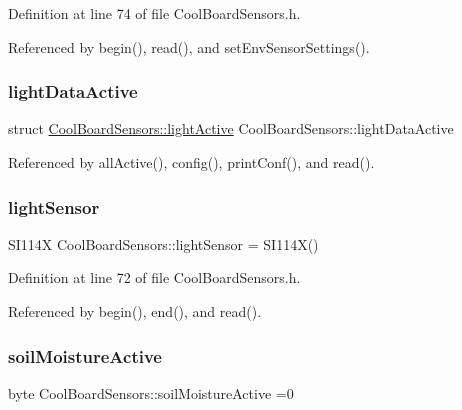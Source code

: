 Definition at line 74 of file Cool\+Board\+Sensors.\+h.



Referenced by begin(), read(), and set\+Env\+Sensor\+Settings().

\mbox{\label{classCoolBoardSensors_ac4deb1cf41bac8b91c780c92fab00ba4}} 
\subsubsection{\texorpdfstring{light\+Data\+Active}{lightDataActive}}
{\footnotesize\ttfamily struct \hyperlink{structCoolBoardSensors_1_1lightActive}{Cool\+Board\+Sensors\+::light\+Active} Cool\+Board\+Sensors\+::light\+Data\+Active\hspace{0.3cm}{\ttfamily [private]}}



Referenced by all\+Active(), config(), print\+Conf(), and read().

\mbox{\label{classCoolBoardSensors_a3e397300fb707dd193e909a757bf6102}} 
\subsubsection{\texorpdfstring{light\+Sensor}{lightSensor}}
{\footnotesize\ttfamily S\+I114X Cool\+Board\+Sensors\+::light\+Sensor = S\+I114X()}



Definition at line 72 of file Cool\+Board\+Sensors.\+h.



Referenced by begin(), end(), and read().

\mbox{\label{classCoolBoardSensors_a31983eecc0f9cd000e1f912206ea4dc8}} 
\subsubsection{\texorpdfstring{soil\+Moisture\+Active}{soilMoistureActive}}
{\footnotesize\ttfamily byte Cool\+Board\+Sensors\+::soil\+Moisture\+Active =0\hspace{0.3cm}{\ttfamily [private]}}



